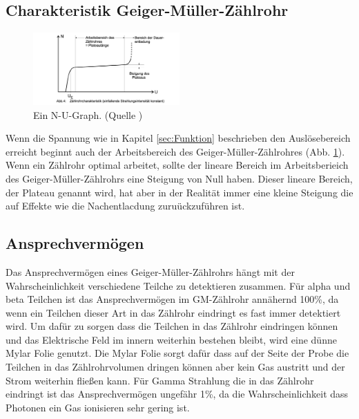 \subsection{Charakteristik Geiger-Müller-Zählrohr}
\begin{figure}
    \centering
    \includegraphics[width=0.5\textwidth]{bilder/Zaehlrohr_N_U_Graph.png}
    \caption{Ein N-U-Graph. (Quelle \cite{Anleitung})}
    \label{fig:Zaehlrohr_N_U_Graph}
\end{figure}
Wenn die Spannung wie in Kapitel \ref{sec:Funktion} beschrieben den Auslösebereich erreicht beginnt auch der Arbeitsbereich des Geiger-Müller-Zählrohres (Abb. \ref{fig:Zaehlrohr_N_U_Graph}).
Wenn ein Zählrohr optimal arbeitet, sollte der lineare Bereich im Arbeitsberieich des Geiger-Müller-Zählrohrs eine Steigung von Null haben.
Dieser lineare Bereich, der Plateau genannt wird, hat aber in der Realität immer eine kleine Steigung die auf Effekte wie die Nachentlacdung zuruückzuführen ist.
\subsection{Ansprechvermögen}
Das Ansprechvermögen eines Geiger-Müller-Zählrohrs hängt mit der Wahrscheinlichkeit verschiedene  Teilche  zu detektieren zusammen.
Für alpha und beta Teilchen ist das Ansprechvermögen im GM-Zählrohr annähernd 100\%, da wenn ein Teilchen dieser Art in das Zählrohr eindringt es fast immer detektiert wird.
Um dafür zu sorgen dass die Teilchen in das Zählrohr eindringen können und das Elektrische Feld im innern weiterhin bestehen bleibt, wird eine dünne Mylar Folie genutzt.
Die Mylar Folie sorgt dafür dass auf der Seite der Probe die Teilchen in das Zählrohrvolumen dringen können aber kein Gas austritt und der Strom weiterhin fließen kann.
Für Gamma Strahlung die in das Zählrohr eindringt ist das Ansprechvermögen ungefähr 1\%, da die Wahrscheinlichkeit dass Photonen ein Gas ionisieren sehr gering ist.
